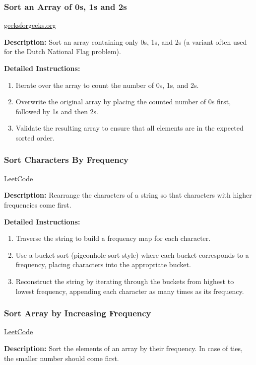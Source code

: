 \subsubsection{Sort an Array of 0s, 1s and 2s}
\href{https://www.geeksforgeeks.org/sort-an-array-of-0s-1s-and-2s/}{geeksforgeeks.org}

\textbf{Description:} Sort an array containing only 0s, 1s, and 2s (a variant often used for the Dutch National Flag problem).

\textbf{Detailed Instructions:}
\begin{enumerate}
    \item Iterate over the array to count the number of 0s, 1s, and 2s.
    \item Overwrite the original array by placing the counted number of 0s first, followed by 1s and then 2s.
    \item Validate the resulting array to ensure that all elements are in the expected sorted order.
\end{enumerate}

\subsubsection{Sort Characters By Frequency}
\href{https://leetcode.com/problems/sort-characters-by-frequency/}{LeetCode}

\textbf{Description:} Rearrange the characters of a string so that characters with higher frequencies come first.

\textbf{Detailed Instructions:}
\begin{enumerate}
    \item Traverse the string to build a frequency map for each character.
    \item Use a bucket sort (pigeonhole sort style) where each bucket corresponds to a frequency, placing characters into the appropriate bucket.
    \item Reconstruct the string by iterating through the buckets from highest to lowest frequency, appending each character as many times as its frequency.
\end{enumerate}

\subsubsection{Sort Array by Increasing Frequency}
\href{https://leetcode.com/problems/sort-array-by-increasing-frequency/}{LeetCode}

\textbf{Description:} Sort the elements of an array by their frequency. In case of ties, the smaller number should come first.

